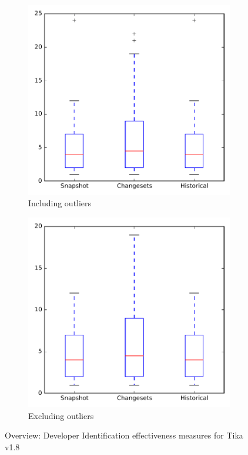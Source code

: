 
\begin{figure}
    \centering
    \begin{subfigure}{.4\textwidth}
        \centering
        \includegraphics[height=0.4\textheight]{figures/dit/all_tika}
        \caption{Including outliers}\label{fig:dit:all:tika_outlier}
    \end{subfigure}%
    \begin{subfigure}{.4\textwidth}
        \centering
        \includegraphics[height=0.4\textheight]{figures/dit/all_tika_no_outlier}
        \caption{Excluding outliers}\label{fig:dit:all:tika_no_outlier}
    \end{subfigure}
\caption{Overview: Developer Identification effectiveness measures for Tika v1.8}
\label{fig:dit:all:tika}
\end{figure}
